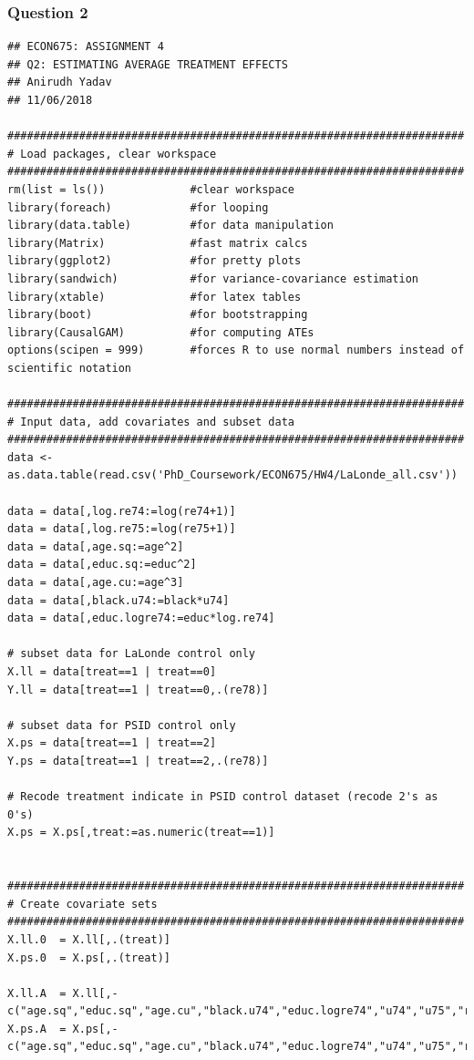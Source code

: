 \documentclass[12pt]{article}
\begin{document}
\subsubsection{Question 2}
\scriptsize
\begin{verbatim}
## ECON675: ASSIGNMENT 4
## Q2: ESTIMATING AVERAGE TREATMENT EFFECTS
## Anirudh Yadav 
## 11/06/2018

######################################################################
# Load packages, clear workspace
######################################################################
rm(list = ls())             #clear workspace
library(foreach)            #for looping
library(data.table)         #for data manipulation
library(Matrix)             #fast matrix calcs
library(ggplot2)            #for pretty plots
library(sandwich)           #for variance-covariance estimation 
library(xtable)             #for latex tables
library(boot)               #for bootstrapping
library(CausalGAM)          #for computing ATEs
options(scipen = 999)       #forces R to use normal numbers instead of scientific notation

######################################################################
# Input data, add covariates and subset data
######################################################################
data <- as.data.table(read.csv('PhD_Coursework/ECON675/HW4/LaLonde_all.csv'))

data = data[,log.re74:=log(re74+1)]
data = data[,log.re75:=log(re75+1)]
data = data[,age.sq:=age^2]
data = data[,educ.sq:=educ^2]
data = data[,age.cu:=age^3]
data = data[,black.u74:=black*u74]
data = data[,educ.logre74:=educ*log.re74]

# subset data for LaLonde control only
X.ll = data[treat==1 | treat==0]
Y.ll = data[treat==1 | treat==0,.(re78)]

# subset data for PSID control only
X.ps = data[treat==1 | treat==2]
Y.ps = data[treat==1 | treat==2,.(re78)]

# Recode treatment indicate in PSID control dataset (recode 2's as 0's)
X.ps = X.ps[,treat:=as.numeric(treat==1)]


######################################################################
# Create covariate sets
######################################################################
X.ll.0  = X.ll[,.(treat)]
X.ps.0  = X.ps[,.(treat)]

X.ll.A  = X.ll[,-c("age.sq","educ.sq","age.cu","black.u74","educ.logre74","u74","u75","re78","re74","re75")]
X.ps.A  = X.ps[,-c("age.sq","educ.sq","age.cu","black.u74","educ.logre74","u74","u75","re78","re74","re75")]


\end{verbatim}
\end{document}
